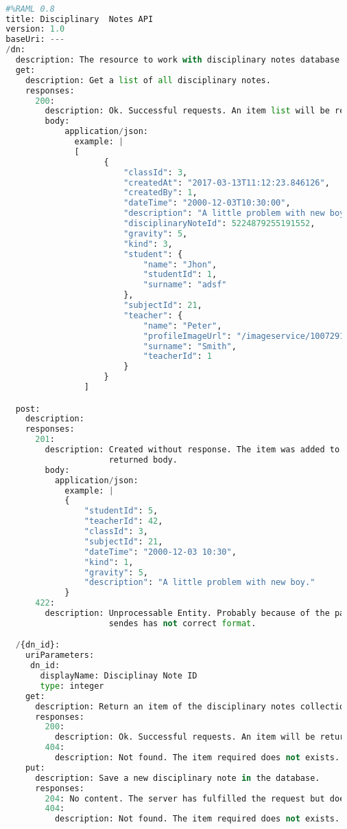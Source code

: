 \begin{lstlisting}[language=python,frame=none]

  #%RAML 0.8
  title: Disciplinary  Notes API
  version: 1.0
  baseUri: ---
  /dn:
    description: The resource to work with disciplinary notes database saved-
    get:
      description: Get a list of all disciplinary notes.
      responses:
        200:
          description: Ok. Successful requests. An item list will be returned.
          body:
              application/json:
                example: |
                [
                      {
                          "classId": 3,
                          "createdAt": "2017-03-13T11:12:23.846126",
                          "createdBy": 1,
                          "dateTime": "2000-12-03T10:30:00",
                          "description": "A little problem with new boy.",
                          "disciplinaryNoteId": 5224879255191552,
                          "gravity": 5,
                          "kind": 3,
                          "student": {
                              "name": "Jhon",
                              "studentId": 1,
                              "surname": "adsf"
                          },
                          "subjectId": 21,
                          "teacher": {
                              "name": "Peter",
                              "profileImageUrl": "/imageservice/10072919.jpg",
                              "surname": "Smith",
                              "teacherId": 1
                          }
                      }
                  ]

    post:
      description:
      responses:
        201:
          description: Created without response. The item was added to database will not
                       returned body.
          body:
            application/json:
              example: |
              {
                  "studentId": 5,
                  "teacherId": 42,
                  "classId": 3,
                  "subjectId": 21,
                  "dateTime": "2000-12-03 10:30",
                  "kind": 1,
                  "gravity": 5,
                  "description": "A little problem with new boy."
              }
        422:
          description: Unprocessable Entity. Probably because of the payload
                       sendes has not correct format.

    /{dn_id}:
      uriParameters:
       dn_id:
         displayName: Disciplinay Note ID
         type: integer
      get:
        description: Return an item of the disciplinary notes collection.
        responses:
          200:
            description: Ok. Successful requests. An item will be returned.
          404:
            description: Not found. The item required does not exists.
      put:
        description: Save a new disciplinary note in the database.
        responses:
          204: No content. The server has fulfilled the request but does not need to return an entity-body.
          404:
            description: Not found. The item required does not exists.


\end{lstlisting}
